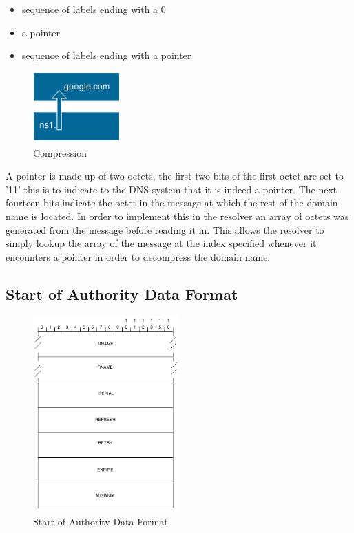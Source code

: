 \documentclass{l3proj}
\begin{document}
\begin{itemize}[noitemsep]
	\item{ sequence of labels ending with a 0 }
	\item{ a pointer }
	\item{ sequence of labels ending with a pointer }
\end{itemize}

\begin{figure}[h]
    \centering
    \includegraphics[width=0.3\textwidth]{images/compression.png}
    \caption{Compression}
    \label{fig:compression}
\end{figure}

A pointer is made up of two octets, the first two bits of the first octet are set to '11' this is to indicate to the DNS system that it is indeed a pointer. The next fourteen bits indicate the octet in the message at which the rest of the domain name is located. In order to implement this in the resolver an array of octets was generated from the message before reading it in. This allows the resolver to simply lookup the array of the message at the index specified whenever it encounters a pointer in order to decompress the domain name.

\subsection{Start of Authority Data Format}

\begin{figure}[h]
    \centering
    \includegraphics[width=0.5\textwidth]{images/soa_format.png}
    \caption{Start of Authority Data Format}
    \label{fig:soa_format}
\end{figure}
\end{document}
